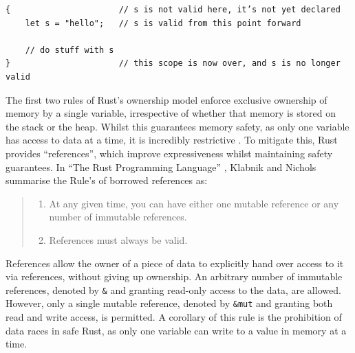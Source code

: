 \begin{listing}[H]
    \begin{verbatim}
{                      // s is not valid here, it’s not yet declared
    let s = "hello";   // s is valid from this point forward

    // do stuff with s
}                      // this scope is now over, and s is no longer valid
    \end{verbatim}
    \caption{A Rust program to demonstrate the scope of variables, from Listing 4-1 of Klabnik and Nichols' ``The Rust Programming Language'' \cite{RustProgrammingLanguage}.}
    \label{listing:rust-scope}
\end{listing}


The first two rules of Rust's ownership model enforce exclusive ownership of memory by a single variable, irrespective of whether that memory is stored on the stack or the heap. Whilst this guarantees memory safety, as only one variable has access to data at a time, it is incredibly restrictive \cite{sautterOBSERVINGPARALLELEXECUTION}. To mitigate this, Rust provides ``references'', which improve expressiveness whilst maintaining safety guarantees. In ``The Rust Programming Language'' \cite{RustProgrammingLanguage}, Klabnik and Nichols summarise the Rule's of borrowed references as:

\begin{quote}
    \begin{enumerate}
        \item At any given time, you can have either one mutable reference or any number of immutable references.
        \item References must always be valid.
    \end{enumerate}
\end{quote}

References allow the owner of a piece of data to explicitly hand over access to it via references, without giving up ownership. An arbitrary number of immutable references, denoted by \texttt{&} and granting read-only access to the data, are allowed. However, only a single mutable reference, denoted by \texttt{&mut} and granting both read and write access, is permitted. A corollary of this rule is the prohibition of data races in safe Rust, as only one variable can write to a value in memory at a time.


